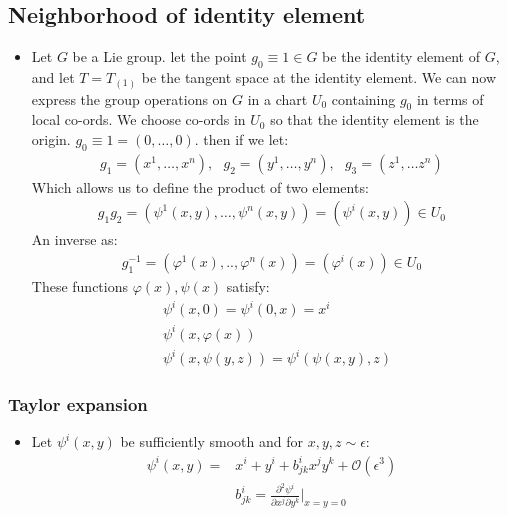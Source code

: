\documentclass[11pt]{article}
\numberwithin{equation}{section}
\begin{document}
\subsection{Neighborhood of identity element}
\begin{itemize}
  \item Let $G$ be a Lie group. let the point $g_0\equiv 1 \in G$ be the identity element of $G$, and let $T = T_{(1)}$ be the tangent space at the identity element. We can now express the group operations on $G$ in a chart $U_0$ containing $g_0$ in terms of local co-ords. We choose co-ords in $U_0$ so that the identity element is the origin. $g_0 \equiv 1 = (0,\ldots,0)$. then if we let:
  \begin{align*}
    g_1=(x^1,\ldots,x^n),~~~g_2=(y^1,\ldots,y^n),~~~g_3=(z^1,\ldots z^n)
  \end{align*}
  Which allows us to define the product of two elements:
  \begin{align*}
    g_1g_2 = (\psi^{1}(x,y),\ldots,\psi^{n}(x,y)) = (\psi^i(x,y)) \in U_0
  \end{align*}
  An inverse as:
  \begin{align*}
    g_1^{-1} = (\varphi^1(x),..,\varphi^n(x)) = (\varphi^i(x)) \in U_0
  \end{align*}
  These functions $\varphi(x),\psi(x)$ satisfy:
  \begin{align*}
    & \psi^i(x,0) = \psi^i(0,x) = x^i \\
    & \psi^i(x,\varphi(x)) \\ 
    & \psi^i(x,\psi(y,z)) = \psi^i(\psi(x,y),z)
  \end{align*}
  \end{itemize}
  \subsubsection{Taylor expansion}
  \begin{itemize}
    \item Let $\psi^i(x,y)$ be sufficiently smooth and for $x,y,z \sim \epsilon $:
    \begin{align*}
      \psi^i(x,y) =&  x^i + y^i + b^{i}_{jk}x^jy^k + \mathcal{O}(\epsilon^3) \\
      & b^i_{jk} = \frac{\partial^2\psi^i}{\partial x^j\partial y^k}\bigg\vert_{x=y=0}
    \end{align*}
  \end{itemize}
\end{document}
